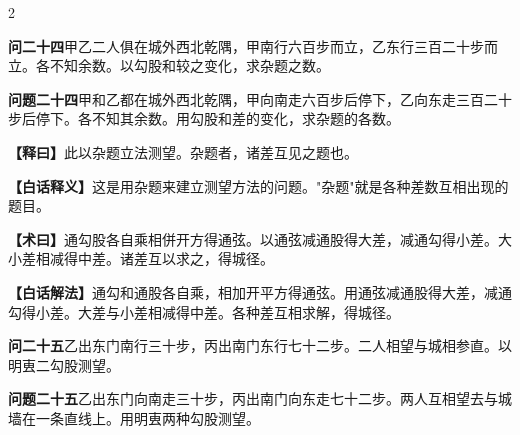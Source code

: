 \documentclass[11pt,a4paper]{article}
\newcommand{\WenQuestion}[1]{\textbf{\textcolor{classicalcolor}{#1}}}
\newcommand{\BaiQuestion}[1]{\textbf{\textcolor{moderncolor}{#1}}}
\newcommand{\WenExplain}{\textcolor{classicalcolor}{\textbf{【释曰】}}}
\newcommand{\BaiExplain}{\textcolor{moderncolor}{\textbf{【白话释义】}}}
\newcommand{\WenMethod}{\textcolor{classicalcolor}{\textbf{【术曰】}}}
\newcommand{\BaiMethod}{\textcolor{moderncolor}{\textbf{【白话解法】}}}
\begin{document}
\begin{paracol}{2}

\switchcolumn*
\begin{tcolorbox}[colback=red!3,colframe=red!30!black,boxrule=0.3pt]
\WenQuestion{问二十四}\quad 甲乙二人俱在城外西北乾隅，甲南行六百步而立，乙东行三百二十步而立。各不知余数。以勾股和较之变化，求杂题之数。
\end{tcolorbox}
\switchcolumn
\begin{tcolorbox}[colback=blue!3,colframe=blue!30!black,boxrule=0.3pt]
\BaiQuestion{问题二十四}\quad 甲和乙都在城外西北乾隅，甲向南走六百步后停下，乙向东走三百二十步后停下。各不知其余数。用勾股和差的变化，求杂题的各数。
\end{tcolorbox}

\switchcolumn*
\begin{tcolorbox}[colback=red!5,colframe=red!30!black,boxrule=0.3pt]
\WenExplain\quad 此以杂题立法测望。杂题者，诸差互见之题也。
\end{tcolorbox}
\switchcolumn
\begin{tcolorbox}[colback=blue!5,colframe=blue!30!black,boxrule=0.3pt]
\BaiExplain\quad 这是用杂题来建立测望方法的问题。"杂题"就是各种差数互相出现的题目。
\end{tcolorbox}

\switchcolumn*
\begin{tcolorbox}[colback=red!5,colframe=red!40!black,boxrule=0.3pt]
\WenMethod\quad 通勾股各自乘相併开方得通弦。以通弦减通股得大差，减通勾得小差。大小差相减得中差。诸差互以求之，得城径。
\end{tcolorbox}
\switchcolumn
\begin{tcolorbox}[colback=blue!5,colframe=blue!40!black,boxrule=0.3pt]
\BaiMethod\quad 通勾和通股各自乘，相加开平方得通弦。用通弦减通股得大差，减通勾得小差。大差与小差相减得中差。各种差互相求解，得城径。
\end{tcolorbox}

\vspace{0.8em}

\switchcolumn*
\begin{tcolorbox}[colback=red!3,colframe=red!30!black,boxrule=0.3pt]
\WenQuestion{问二十五}\quad 乙出东门南行三十步，丙出南门东行七十二步。二人相望与城相参直。以明叀二勾股测望。
\end{tcolorbox}
\switchcolumn
\begin{tcolorbox}[colback=blue!3,colframe=blue!30!black,boxrule=0.3pt]
\BaiQuestion{问题二十五}\quad 乙出东门向南走三十步，丙出南门向东走七十二步。两人互相望去与城墙在一条直线上。用明叀两种勾股测望。
\end{tcolorbox}


\end{paracol}
\end{document}
